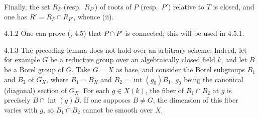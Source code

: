 Finally, the set $R_P$ (resp.~$R_{P'}$) of roots of $P$ (resp.~$P'$) relative to $T$ is closed, and one has $R'=R_P\cap R_{P'}$, whence (ii).

\begin{remark}{4.1.2}\label{XXVI.4.1.2}
One can prove (\cite{BT65}, 4.5) that $P\cap P'$ is connected; this will be used in 4.5.1.
\end{remark}
\begin{remark}{4.1.3}\label{XXVI.4.1.3}
The preceding lemma does not hold over an arbitrary scheme. Indeed, let for example $G$ be a reductive group over an algebraically closed field $k$, and let $B$ be a Borel group of $G$. Take $G=X$ as base, and consider the Borel subgroups $B_1$ and $B_2$ of $G_X$, where $B_1=B_X$ and $B_2=\operatorname{int}(g_0)B_1$, $g_0$ being the canonical (diagonal) section of $G_X$. For each $g\in X(k)$, the fiber of $B_1\cap B_2$ at $g$ is precisely $B\cap\operatorname{int}(g)B$. If one supposes $B\ne G$, the dimension of this fiber varies with $g$, so $B_1\cap B_2$ cannot be smooth over $X$.
\end{remark}

